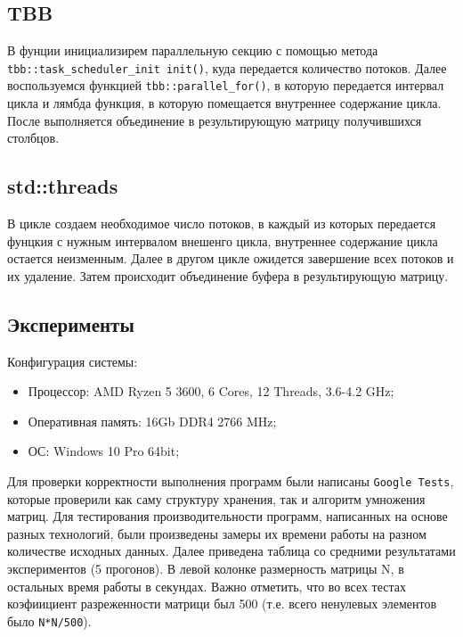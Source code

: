\documentclass{report}
\begin{document}
\subsection*{TBB}
\par В фунции инициализирем параллельную секцию с помощью метода \\\verb|tbb::task_scheduler_init init()|, куда передается количество потоков. Далее воспользуемся функцией \verb|tbb::parallel_for()|, в которую передается интервал цикла и лямбда функция, в которую помещается внутреннее содержание цикла. После выполняется объединение в результирующую матрицу получившихся столбцов.

\subsection*{std::threads}
\par В цикле создаем необходимое число потоков, в каждый из которых передается фунцкия с нужным интервалом внешенго цикла, внутреннее содержание цикла остается неизменным. Далее в другом цикле ожидется завершение всех потоков и их удаление. Затем происходит объединение буфера в результирующую матрицу.

\newpage

\begin{center}\section*{Эксперименты}\end{center}
Конфигурация системы:
\begin{itemize}
\item Процессор: AMD Ryzen 5 3600, 6 Cores, 12 Threads, 3.6-4.2 GHz;
\item Оперативная память: 16Gb DDR4 2766 MHz;
\item ОС: Windows 10 Pro 64bit;
\end{itemize}

\par Для проверки корректности выполнения программ были написаны \verb|Google Tests|, которые проверили как саму структуру хранения, так и алгоритм умножения матриц. Для тестирования производительности программ, написанных на основе разных технологий, были произведены замеры их времени работы на разном количестве исходных данных. Далее приведена таблица со средними результатами экспериментов (5 прогонов). В левой колонке размерность матрицы N, в остальных время работы в секундах. Важно отметить, что во всех тестах коэфиициент разреженности матрици был 500 (т.е. всего ненулевых элементов было \verb|N*N/500|).
\end{document}
